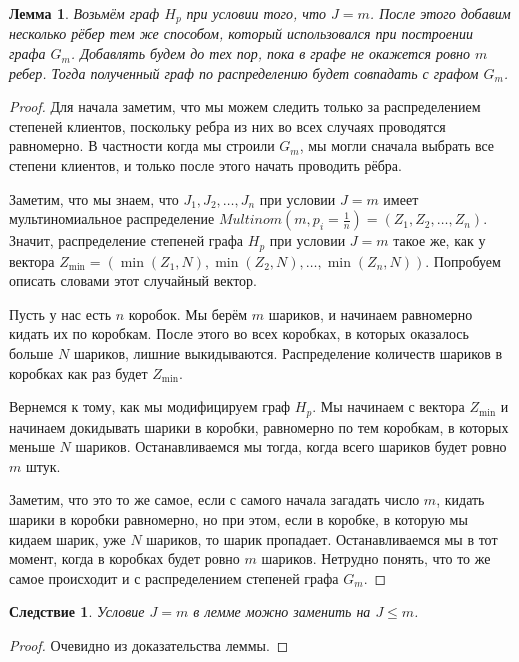 \documentclass{matmex-diploma-custom}
\newcommand{\leqs}{\leqslant}
\newtheorem{cons}{Следствие}
\newtheorem{lemma}{Лемма}
\theoremstyle{named}
\begin{document}
\begin{lemma} \label{l2}
Возьмём граф $H_p$ при условии того, что $J = m$. 
После этого добавим несколько рёбер тем же способом, который использовался при построении графа $G_m$. 
Добавлять будем до тех пор, пока в графе не окажется ровно $m$ ребер. 
Тогда полученный граф по распределению будет совпадать с графом $G_m$.
\end{lemma}
\begin{proof}
Для начала заметим, что мы можем следить только за распределением степеней клиентов, 
поскольку ребра из них во всех случаях проводятся равномерно. В частности когда мы строили $G_m$, 
мы могли сначала выбрать все степени клиентов, и только после этого начать проводить рёбра.

Заметим, что мы знаем, что $J_1, J_2, \dots, J_n$ при условии $J = m$ имеет мультиномиальное распределение 
$Multinom(m, p_i=\frac{1}{n}) = (Z_1, Z_2, \dots, Z_n)$. Значит, распределение степеней графа $H_p$ при условии $J = m$ такое же,
как у вектора $Z_{\min} = (\min(Z_1, N), \min(Z_2, N), \dots, \min(Z_n, N))$.
Попробуем описать словами этот случайный вектор.

Пусть у нас есть $n$ коробок. Мы берём $m$ шариков, и начинаем равномерно кидать их по коробкам. 
После этого во всех коробках, в которых оказалось больше $N$ шариков, лишние выкидываются.
Распределение количеств шариков в коробках как раз будет $Z_{\min}$. 

Вернемся к тому, как мы модифицируем граф $H_p$. Мы начинаем с вектора $Z_{\min}$ и начинаем докидывать шарики в коробки, 
равномерно по тем коробкам, в которых меньше $N$ шариков. Останавливаемся мы тогда, когда всего шариков будет ровно $m$ штук.

Заметим, что это то же самое, если с самого начала загадать число $m$, кидать шарики в коробки равномерно, 
но при этом, если в коробке, в которую мы кидаем шарик, уже $N$ шариков, то шарик пропадает. 
Останавливаемся мы в тот момент, когда в коробках будет ровно $m$ шариков. 
Нетрудно понять, что то же самое происходит и с распределением степеней графа $G_m$.
\end{proof}

\begin{cons} \label{cons_1}
Условие $J = m$ в лемме можно заменить на $J \leqs m$.
\end{cons}
\begin{proof}
Очевидно из доказательства леммы.
\end{proof}
\end{document}
